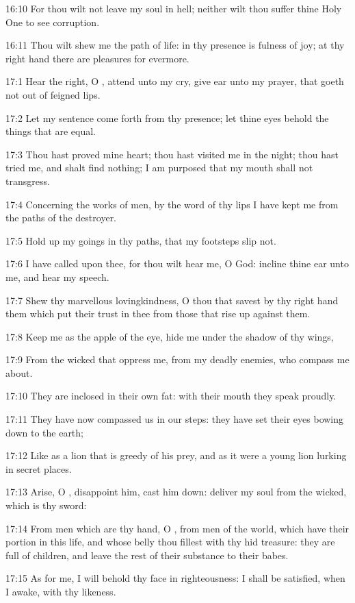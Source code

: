16:10 For thou wilt not leave my soul in hell; neither wilt thou
suffer thine Holy One to see corruption.

16:11 Thou wilt shew me the path of life: in thy presence is fulness
of joy; at thy right hand there are pleasures for evermore.



17:1 Hear the right, O \LORD, attend unto my cry, give ear unto my
prayer, that goeth not out of feigned lips.

17:2 Let my sentence come forth from thy presence; let thine eyes
behold the things that are equal.

17:3 Thou hast proved mine heart; thou hast visited me in the night;
thou hast tried me, and shalt find nothing; I am purposed that my
mouth shall not transgress.

17:4 Concerning the works of men, by the word of thy lips I have kept
me from the paths of the destroyer.

17:5 Hold up my goings in thy paths, that my footsteps slip not.

17:6 I have called upon thee, for thou wilt hear me, O God: incline
thine ear unto me, and hear my speech.

17:7 Shew thy marvellous lovingkindness, O thou that savest by thy
right hand them which put their trust in thee from those that rise up
against them.

17:8 Keep me as the apple of the eye, hide me under the shadow of thy
wings,

17:9 From the wicked that oppress me, from my deadly enemies, who
compass me about.

17:10 They are inclosed in their own fat: with their mouth they speak
proudly.

17:11 They have now compassed us in our steps: they have set their
eyes bowing down to the earth;

17:12 Like as a lion that is greedy of his prey, and as it were a
young lion lurking in secret places.

17:13 Arise, O \LORD, disappoint him, cast him down: deliver my soul
from the wicked, which is thy sword:

17:14 From men which are thy hand, O \LORD, from men of the world,
which have their portion in this life, and whose belly thou fillest
with thy hid treasure: they are full of children, and leave the rest
of their substance to their babes.

17:15 As for me, I will behold thy face in righteousness: I shall be
satisfied, when I awake, with thy likeness.



